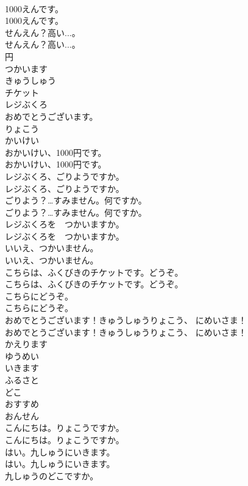 \documentclass[8pt]{extreport}
\begin{document}
\begin{CJK}{UTF8}{min}
\\	1000えんです。	
\\	1000えんです。 
\\	せんえん？高い...。	
\\	せんえん？高い...。 
\\	円
\\	つかいます
\\	きゅうしゅう
\\	チケット
\\	レジぶくろ
\\	おめでとうございます。
\\	りょこう
\\	かいけい
\\	おかいけい、1000円です。	
\\	おかいけい、1000円です。 
\\	レジぶくろ、ごりようですか。	
\\	レジぶくろ、ごりようですか。 
\\	ごりよう？…すみません。何ですか。	
\\	ごりよう？…すみません。何ですか。 
\\	レジぶくろを　つかいますか。	
\\	レジぶくろを　つかいますか。 
\\	いいえ、つかいません。	
\\	いいえ、つかいません。 
\\	こちらは、ふくびきのチケットです。どうぞ。	
\\	こちらは、ふくびきのチケットです。どうぞ。 
\\	こちらにどうぞ。	
\\	こちらにどうぞ。 
\\	おめでとうございます！きゅうしゅうりょこう、 にめいさま！	
\\	おめでとうございます！きゅうしゅうりょこう、 にめいさま！ 
\\	かえります
\\	ゆうめい
\\	いきます
\\	ふるさと
\\	どこ
\\	おすすめ
\\	おんせん
\\	こんにちは。りょこうですか。	
\\	こんにちは。りょこうですか。 
\\	はい。九しゅうにいきます。	
\\	はい。九しゅうにいきます。 
\\	九しゅうのどこですか。	

\end{CJK}
\end{document}
